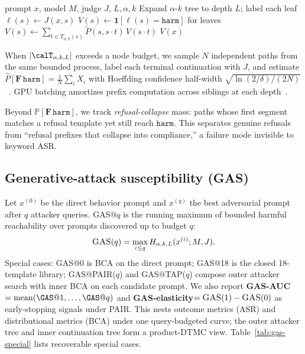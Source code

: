 \documentclass{article}
\newcommand{\Prob}{\mathbb{P}}
\newcommand{\harm}{\texttt{harm}}
\newcommand{\BCA}{\textsc{BCA}}
\newcommand{\ASR}{\textsc{ASR}}
\newcommand{\GAS}{\textsc{GAS}}
\newcommand{\DTMC}{\textsc{DTMC}}
\begin{document}
\begin{algorithm}[t]
\caption{Exact \BCA{} (reachability on bounded tree)}
\label{alg:bca}
\begin{algorithmic}[1]
\Require prompt $x$, model $M$, judge $J$, $L,\alpha,k$
\State Expand $\alpha$-$k$ tree to depth $L$; label each leaf $\ell(s)\gets J(x,s)$
\State $V(s)\gets \mathbf{1}[\ell(s)=\harm]$ for leaves
  \State $V(s)\gets \sum_{t\in T_{\alpha,k}(s)} \widetilde P(s,s\cdot t)\,V(s\cdot t)$
\EndFor
\State \Return $V(x)$
\end{algorithmic}
\end{algorithm}

When $|\calT_{\alpha,k,L}|$ exceeds a node budget, we sample $N$ independent paths from the same bounded process, label each terminal continuation with $J$, and estimate $\widehat P[\mathbf{F}\,\harm]=\frac{1}{N}\sum_i X_i$ with Hoeffding confidence half-width $\sqrt{\ln(2/\delta)/(2N)}$~\citep{hoeffding1963}.
GPU batching amortizes prefix computation across siblings at each depth~\citep{kwon2023efficient}.

Beyond $\Prob[\mathbf{F}\,\harm]$, we track \emph{refusal-collapse} mass: paths whose first segment matches a refusal template yet still reach $\harm$.
This separates genuine refusals from ``refusal prefixes that collapse into compliance,'' a failure mode invisible to keyword \ASR{}.

\subsection{Generative-attack susceptibility (\GAS)}

Let $x^{(0)}$ be the direct behavior prompt and $x^{(q)}$ the best adversarial prompt after $q$ attacker queries.
\GAS{}@$q$ is the running maximum of bounded harmful reachability over prompts discovered up to budget $q$:
\[
  \GAS(q) = \max_{i\leq q} H_{\alpha,k,L}(x^{(i)};M,J).
\]
Special cases: \GAS{}@0 is \BCA{} on the direct prompt; \GAS{}@18 is the closed 18-template library; \GAS{}@PAIR($q$) and \GAS{}@TAP($q$) compose outer attacker search with inner \BCA{} on each candidate prompt.
We also report \textbf{\GAS-AUC}$=\mathrm{mean}(\GAS@1,\ldots,\GAS@q)$ and \textbf{\GAS-elasticity}$=\GAS(1)-\GAS(0)$ as early-stopping signals under PAIR.
This nests outcome metrics (\ASR{}) and distributional metrics (\BCA{}) under one query-budgeted curve; the outer attacker tree and inner continuation tree form a product-\DTMC{} view.
Table~\ref{tab:gas-special} lists recoverable special cases.
\end{document}
